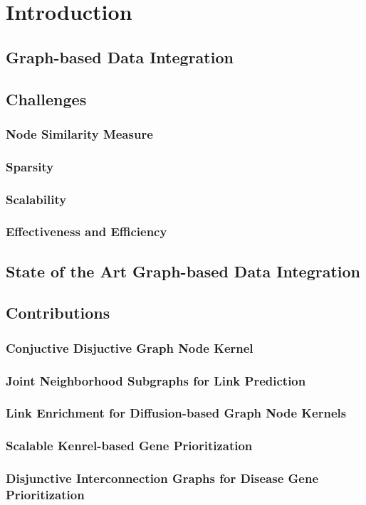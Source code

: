 \chapter{Introduction}
\section{Graph-based Data Integration}
\section{Challenges}
	\subsection{Node Similarity Measure}
	\subsection{Sparsity}
	\subsection{Scalability}
	\subsection{Effectiveness and Efficiency}
\section{State of the Art Graph-based Data Integration}
\section{Contributions}
\subsection{Conjuctive Disjuctive Graph Node Kernel}
\subsection{Joint Neighborhood Subgraphs for Link Prediction}
\subsection{Link Enrichment for Diffusion-based Graph Node Kernels}
\subsection{Scalable Kenrel-based Gene Prioritization}
\subsection{Disjunctive Interconnection Graphs for Disease Gene Prioritization}